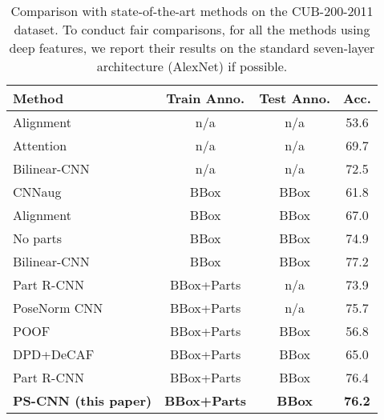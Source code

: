 \documentclass[10pt,twocolumn,letterpaper]{article}
\begin{document}
\begin{table}[ht]
\small
\begin{center}
\begin{tabular}{|l|c|c|c|}
\hline
Method                                & Train Anno.& Test Anno. & Acc.\\
\hline
Alignment \cite{gavves2013fine}       & n/a        & n/a        & 53.6 \\
Attention \cite{xiao2014application}  & n/a        & n/a        & 69.7 \\
Bilinear-CNN \cite{lin2015bilinear}   & n/a        & n/a        & 72.5 \\
\hline
CNNaug \cite{razavian2014cnn}         & BBox       & BBox       & 61.8 \\
Alignment \cite{gavves2013fine}       & BBox       & BBox       & 67.0 \\
No parts \cite{krause2015fine}        & BBox       & BBox       & 74.9 \\
Bilinear-CNN \cite{lin2015bilinear}   & BBox       & BBox       & 77.2 \\
\hline
Part R-CNN \cite{zhang2014part}       & BBox+Parts & n/a        & 73.9 \\
PoseNorm CNN \cite{branson2014bird}   & BBox+Parts & n/a        & 75.7 \\
\hline
POOF \cite{berg2013poof}              & BBox+Parts & BBox       & 56.8 \\
DPD+DeCAF\cite{donahue2013decaf}      & BBox+Parts & BBox       & 65.0 \\
Part R-CNN \cite{zhang2014part}       & BBox+Parts & BBox       & 76.4 \\
\textbf{PS-CNN (this paper)}          & \textbf{BBox+Parts} &  \textbf{BBox}       & \textbf{76.2}\\
\hline
\end{tabular}
\end{center}
\caption{Comparison with state-of-the-art methods on the CUB-200-2011 dataset. To conduct fair comparisons, for all the methods using deep features, we report their results on the standard seven-layer architecture (AlexNet) if possible.}
\label{tab:cls}
\end{table}
\end{document}
